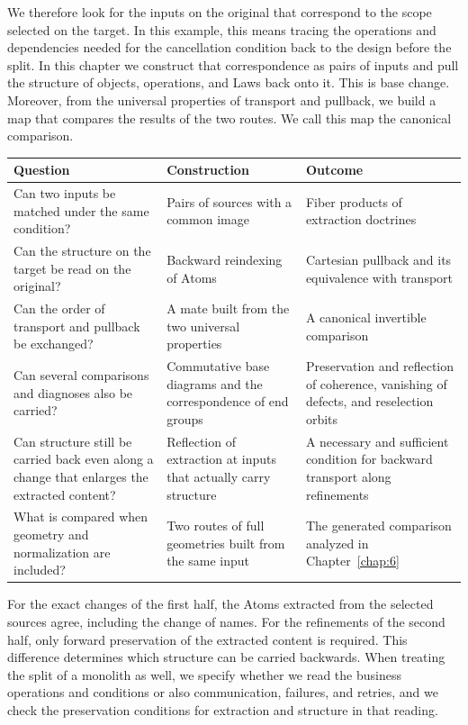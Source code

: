 We therefore look for the inputs on the original that correspond to the scope selected on the
target. In this example, this means tracing the operations and dependencies needed for the
cancellation condition back to the design before the split. In this chapter we construct that
correspondence as pairs of inputs and pull the structure of objects, operations, and Laws back
onto it. This is base change. Moreover, from the universal properties of transport and
pullback, we build a map that compares the results of the two routes. We call this map the
canonical comparison.

\begin{xltabular}{\linewidth}{@{}LLL@{}}
\toprule
Question & Construction & Outcome \\
\midrule
\endhead
Can two inputs be matched under the same condition? & Pairs of sources with a common image &
Fiber products of extraction doctrines \\
\addlinespace[3pt]
Can the structure on the target be read on the original? & Backward reindexing of Atoms &
Cartesian pullback and its equivalence with transport \\
\addlinespace[3pt]
Can the order of transport and pullback be exchanged? & A mate built from the two universal properties & A canonical invertible comparison \\
\addlinespace[3pt]
Can several comparisons and diagnoses also be carried? & Commutative base diagrams and the
correspondence of end groups & Preservation and reflection of coherence, vanishing of defects,
and reselection orbits \\
\addlinespace[3pt]
Can structure still be carried back even along a change that enlarges the extracted content? & Reflection of extraction at
inputs that actually carry structure & A necessary and sufficient condition for backward
transport along refinements \\
\addlinespace[3pt]
What is compared when geometry and normalization are included? & Two routes of full geometries
built from the same input & The generated
comparison analyzed in Chapter~\ref{chap:6} \\
\bottomrule
\end{xltabular}

For the exact changes of the first half, the Atoms extracted from the selected sources agree,
including the change of names. For the refinements of the second half, only forward
preservation of the extracted content is required. This difference determines which structure
can be carried backwards. When treating the split of a monolith as well, we specify whether we
read the business operations and conditions or also communication, failures, and retries, and
we check the preservation conditions for extraction and structure in that reading.

